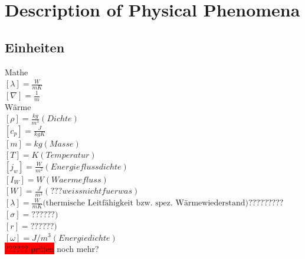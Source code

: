 \documentclass[a4paper]{scrartcl}
\begin{document}
\newpage
\tableofcontents

\newpage

\section{Description of Physical Phenomena}
\subsection{Einheiten}

Mathe\\
$ [\lambda]=\frac{W}{mK} $\\
$ [\nabla]=\frac{1}{m} $\\

Wärme\\
$ [\rho]=\frac{kg}{m^3} (Dichte)$\\
$ [c_p]=\frac{J}{kgK} $\\
$ [m]=kg (Masse)$\\
$ [T]=K (Temperatur)$\\
$ [j_w]=\frac{W}{m^2} (Energieflussdichte)$\\
$ [I_W]=W (Waermefluss)$\\
$ [W]=\frac{J}{m^3} (???weiss nicht fuer was)$\\
$ [ \lambda ] = \frac{W}{mK} \text{(thermische Leitfähigkeit bzw. spez.  Wärmewiederstand)}????????? $\\
$ [ \sigma ]=??? ???)$\\
$ [ r ]=??? ???)$\\
$ [\omega] = J/m^3 (Energiedichte)$ \\
\colorbox{red}{?????? prüfen} noch mehr? \\
\end{document}
